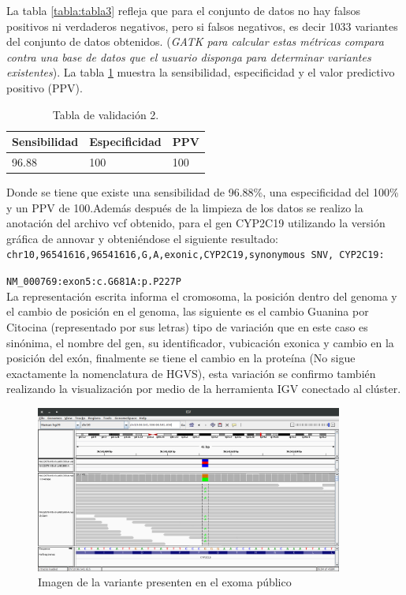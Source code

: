 La tabla \ref{tabla:tabla3} refleja que para el conjunto de datos no hay falsos positivos ni verdaderos negativos, pero si falsos negativos, es decir 1033 variantes del conjunto de datos obtenidos. (\textit{GATK para calcular estas métricas compara contra una base de datos que el usuario disponga para determinar variantes existentes}).  La tabla \ref{tabla:tabla4} muestra la sensibilidad, especificidad y el valor predictivo positivo (PPV).

\begin{table}[H]
	\begin{center}
		\begin{tabular}{|l|l|l|}
			\hline 
			\textbf{Sensibilidad} & \textbf{Especificidad} & \textbf{PPV} \\
			\hline 
			96.88 & 100 & 100 \\ \hline
		\end{tabular}
		\caption{Tabla de validación 2.}
		\label{tabla:tabla4}
	\end{center}
\end{table}

Donde se tiene que existe una sensibilidad de 96.88\%, una especificidad del 100\% y un PPV de 100.Además después de la limpieza de los datos se realizo la anotación del archivo vcf obtenido, para el gen CYP2C19 utilizando la versión gráfica de annovar \cite{Yang2015} y obteniéndose el siguiente resultado: \\

\texttt{chr10,96541616,96541616,G,A,exonic,CYP2C19,synonymous SNV, CYP2C19:}

\texttt{NM\_000769:exon5:c.G681A:p.P227P} \\

La representación escrita informa el cromosoma, la posición dentro del genoma y el cambio de posición en el genoma, las siguiente es el cambio Guanina por Citocina (representado por sus letras) tipo de variación que en este caso es sinónima, el nombre del gen, su identificador, vubicación exonica y cambio en la posición del exón, finalmente se tiene el cambio en la proteína (No sigue exactamente la nomenclatura de HGVS), esta variación se confirmo también realizando la visualización por medio de la herramienta IGV conectado al clúster.

\begin{figure}[H]
	\centering
	\includegraphics[width=0.9\textwidth]{Kap2/IGV}
	\caption{Imagen de la variante presenten en el exoma público} \label{fig:igv}
\end{figure}

